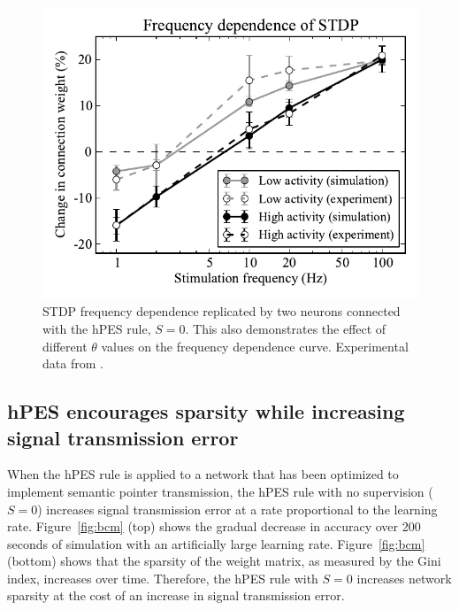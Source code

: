 \documentclass[10pt,letterpaper]{article}
\begin{document}
\begin{figure}[ht]
\begin{center}
\includegraphics[width=\columnwidth]{fig2-bcm-stdp-frequency}
\end{center}
\caption{STDP frequency dependence replicated by two neurons
  connected with the hPES rule, $S = 0$.
  This also demonstrates the effect of different $\theta$
  values on the frequency dependence curve.
  Experimental data from \cite{Kirkwood1996}.}
\label{fig:stdp-freq}
\end{figure}

\subsection{hPES encourages sparsity while increasing signal
  transmission error}

When the hPES rule is applied to
a network that has been optimized
to implement semantic pointer transmission,
the hPES rule with no supervision ($S = 0$)
increases signal transmission error at
a rate proportional to the learning rate.
Figure~\ref{fig:bcm} (top) shows the gradual
decrease in accuracy over 200 seconds of simulation
with an artificially large learning rate.
Figure~\ref{fig:bcm} (bottom) shows that the sparsity
of the weight matrix, as measured by the Gini index,
increases over time.
Therefore, the hPES rule with $S = 0$
increases network sparsity
at the cost of an increase in signal transmission error.
\end{document}

